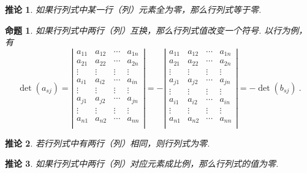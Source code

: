 \documentclass[zihao=-4,UTF8,linespread=1.8,nothm]{aytony_base}
\newtheorem*{proposition*}{\indent 命题}
\newtheorem*{corollary}{\indent 推论}
\begin{document}
\begin{corollary}
    如果行列式中某一行（列）元素全为零，那么行列式等于零.
\end{corollary}

\begin{proposition*}
    如果行列式中两行（列）互换，那么行列式值改变一个符号. 以行为例，有 $$
        \det(a_{sj}) = \left|
        \begin{matrix}
            a_{11} & a_{12} & \cdots & a_{1n} \\
            a_{21} & a_{22} & \cdots & a_{2n} \\
            \vdots & \vdots & \vdots & \vdots \\
            a_{i1} & a_{i2} & \cdots & a_{in} \\
            \vdots & \vdots & \vdots & \vdots \\
            a_{j1} & a_{j2} & \cdots & a_{jn} \\
            \vdots & \vdots & \vdots & \vdots \\
            a_{n1} & a_{n2} & \cdots & a_{nn} \\
        \end{matrix}
        \right| = - \left|
        \begin{matrix}
            a_{11} & a_{12} & \cdots & a_{1n} \\
            a_{21} & a_{22} & \cdots & a_{2n} \\
            \vdots & \vdots & \vdots & \vdots \\
            a_{j1} & a_{j2} & \cdots & a_{jn} \\
            \vdots & \vdots & \vdots & \vdots \\
            a_{i1} & a_{i2} & \cdots & a_{in} \\
            \vdots & \vdots & \vdots & \vdots \\
            a_{n1} & a_{n2} & \cdots & a_{nn} \\
        \end{matrix}
        \right| = -\det(b_{sj})\ .
    $$
\end{proposition*}

\begin{corollary}
    若行列式中有两行（列）相同，则行列式为零.
\end{corollary}

\begin{corollary}
    如果行列式中两行（列）对应元素成比例，那么行列式的值为零.
\end{corollary}
\end{document}

